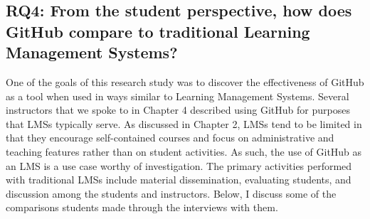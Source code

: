 




\subsection{RQ4: From the student perspective, how does GitHub compare to traditional Learning Management Systems?}
One of the goals of this research study was to discover the effectiveness of GitHub as a tool when used in ways similar to Learning Management Systems. Several instructors that we spoke to in Chapter 4 described using GitHub for purposes that LMSs typically serve. As discussed in Chapter 2, LMSs tend to be limited in that they encourage self-contained courses and focus on administrative and teaching features rather than on student activities. As such, the use of GitHub as an LMS is a use case worthy of investigation. The primary activities performed with traditional LMSs include material dissemination, evaluating students, and discussion among the students and instructors. Below, I discuss some of the comparisons students made through the interviews with them. \\


